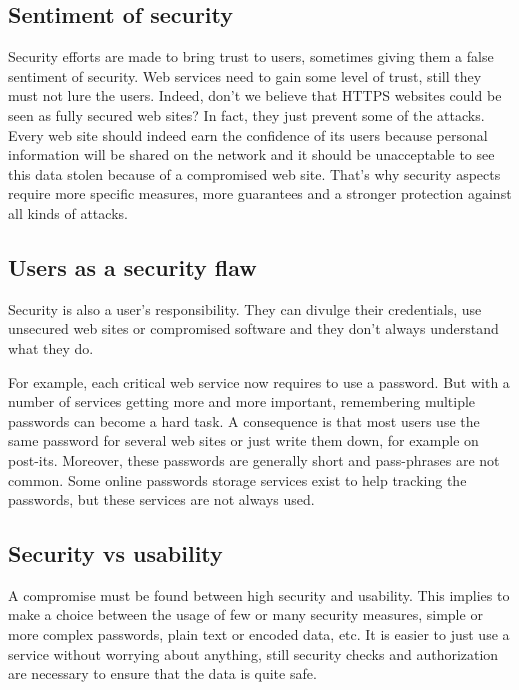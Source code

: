 \subsection{Sentiment of security}

Security efforts are made to bring trust to users, sometimes giving them a
false sentiment of security. Web services need to gain some level of trust, still they
must not lure the users. Indeed, don't we believe that HTTPS websites could be
seen as fully secured web sites? In fact, they just prevent some of the
attacks.
Every web site should indeed earn the confidence of its users because
personal information will be shared on the network and it should be
unacceptable to see this data stolen because of a compromised web
site. That's why security aspects require more specific measures, more
guarantees and a stronger protection against all kinds of attacks.

\subsection{Users as a security flaw}

Security is also a user's responsibility. They can divulge their
credentials, use unsecured web sites or compromised software and they
don't always understand what they do.

For example, each critical web service now requires to use a password.
But with a number of services getting more and more important, remembering
multiple passwords can become a hard task. A consequence is that most users use
the same password for several web sites or just write them down, for example
on post-its. Moreover, these passwords are generally short and pass-phrases are
not common.
Some online passwords storage services exist to help tracking the passwords, but
these services are not always used.

\subsection{Security vs usability}

A compromise must be found between high security and usability.
This implies to make a choice between the usage of few or many security
measures, simple or more complex passwords, plain text or encoded data, etc.
It is easier to just use a service without worrying about anything, still
security checks and authorization are necessary to ensure that the data is
quite safe.

